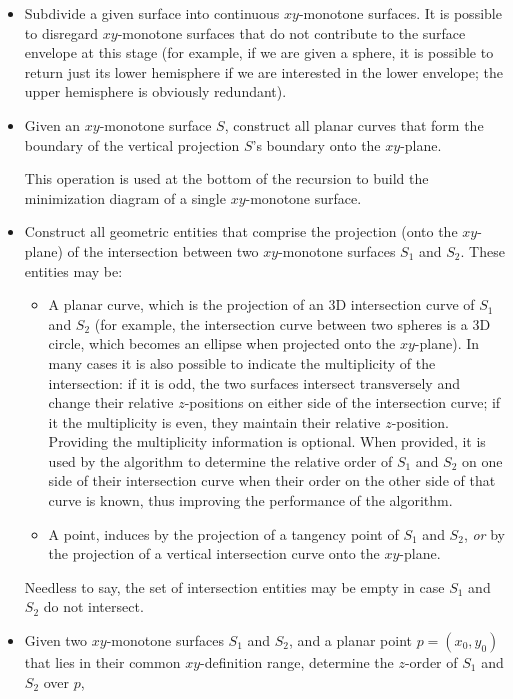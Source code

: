 \begin{itemize}
\item Subdivide a given surface into continuous $xy$-monotone
surfaces. It is possible to disregard $xy$-monotone surfaces
that do not contribute to the surface envelope at this stage
(for example, if we are given a sphere, it is possible to return
just its lower hemisphere if we are interested in the lower
envelope; the upper hemisphere is obviously redundant).
%
\item Given an $xy$-monotone surface $S$, construct all planar
curves that form the boundary of the vertical projection $S$'s
boundary onto the $xy$-plane.

This operation is used at the bottom of the recursion to build the
minimization diagram of a single $xy$-monotone surface.
%
\item Construct all geometric entities that comprise the projection
(onto the $xy$-plane) of the intersection between two $xy$-monotone
surfaces $S_1$ and $S_2$. These entities may be:
  \begin{itemize}
  \item A planar curve, which is the projection of an 3D intersection
  curve of $S_1$ and $S_2$ (for example, the intersection curve
  between two spheres is a 3D circle, which becomes an ellipse when
  projected onto the $xy$-plane).
  In many cases it is also possible to indicate the multiplicity of
  the intersection: if it is odd, the two surfaces intersect
  transversely and change their relative $z$-positions on either
  side of the intersection curve; if it the multiplicity is even,
  they maintain their relative $z$-position.
  Providing the multiplicity information is optional. When provided,
  it is used by the algorithm to determine the relative order of $S_1$
  and $S_2$ on one side of their intersection curve when their order
  on the other side of that curve is known, thus improving the
  performance of the algorithm.
  \item A point, induces by the projection of a tangency point
  of $S_1$ and $S_2$, {\em or} by the projection of a vertical
  intersection curve onto the $xy$-plane.
  \end{itemize}
Needless to say, the set of intersection entities may be empty in
case $S_1$ and $S_2$ do not intersect.
%
\item Given two $xy$-monotone surfaces $S_1$ and $S_2$, and a
planar point $p = (x_0,y_0)$ that lies in their common $xy$-definition
range, determine the $z$-order of $S_1$ and $S_2$ over $p$,

\end{itemize}
